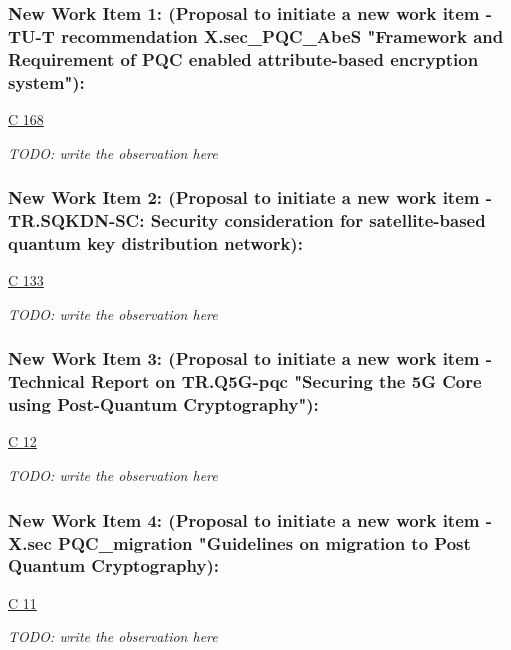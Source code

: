 \subsubsection{New Work Item 1: (Proposal to initiate a new work item -TU-T recommendation X.sec\_PQC\_AbeS "Framework and Requirement of PQC enabled attribute-based encryption system"):}

\href{https://www.itu.int/md/meetingdoc.asp?lang=en\&parent=T25-SG17-C-0168}{C 168 }

\textit{TODO: write the observation here}

\subsubsection{New Work Item 2: (Proposal to initiate a new work item - TR.SQKDN-SC: Security consideration for satellite-based quantum key distribution network):}

\href{https://www.itu.int/md/meetingdoc.asp?lang=en\&parent=T25-SG17-C-0133}{C 133 }

\textit{TODO: write the observation here}

\subsubsection{New Work Item 3: (Proposal to initiate a new work item -Technical Report on TR.Q5G-pqc "Securing the 5G Core using Post-Quantum Cryptography"):}

\href{https://www.itu.int/md/meetingdoc.asp?lang=en\&parent=T25-SG17-C-0012}{C 12 }

\textit{TODO: write the observation here}

\subsubsection{New Work Item 4: (Proposal to initiate a new work item - X.sec PQC\_migration "Guidelines on migration to Post Quantum Cryptography):}

\href{https://www.itu.int/md/meetingdoc.asp?lang=en\&parent=T25-SG17-C-0011}{C 11 }

\textit{TODO: write the observation here}
